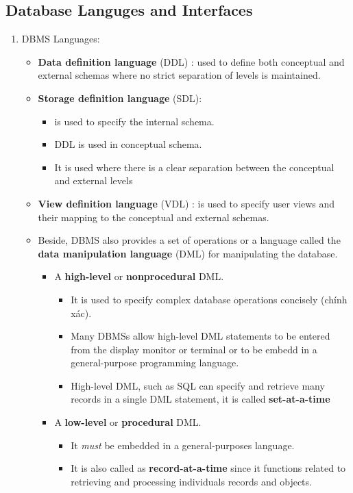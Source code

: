 \documentclass[10pt]{article}
\begin{document}
\subsection{Database Languges and Interfaces}
\begin{enumerate}
	\item DBMS Languages:
	\begin{itemize}
		\item \textbf{Data definition language} (DDL) : used to define both conceptual and external schemas where no strict separation of levels is maintained.
		\item \textbf{Storage definition language} (SDL):
		\begin{itemize}
			\item is used to specify the internal schema.
			\item DDL is used in conceptual schema.
			\item It is used where there is a clear separation between the conceptual and external levels
		\end{itemize}  
		\item \textbf{View definition language} (VDL) : is used to specify user views and their mapping to the conceptual and external schemas.
		\item Beside, DBMS also provides a set of operations or a language called the \textbf{data manipulation language} (DML) for manipulating the database. \\

		\begin{itemize}
			\item A \textbf{high-level} or \textbf{nonprocedural} DML.
			\begin{itemize}
				\item It is used to specify complex database operations concisely (chính xác).
				\item Many DBMSs allow high-level DML statements to be entered from the display monitor or terminal or to be embedd in a general-purpose programming language.
				\item High-level DML, such as SQL can specify and retrieve many records in a single DML statement, it is called \textbf{set-at-a-time} 
			\end{itemize}
			\item A \textbf{low-level} or \textbf{procedural} DML.
			\begin{itemize}
				\item It \textit{must} be embedded in a general-purposes language.
				\item It is also called as \textbf{record-at-a-time} since it functions related to retrieving and processing individuals records and objects.
			\end{itemize}
		\end{itemize}


\end{itemize}
\end{enumerate}
\end{document}
